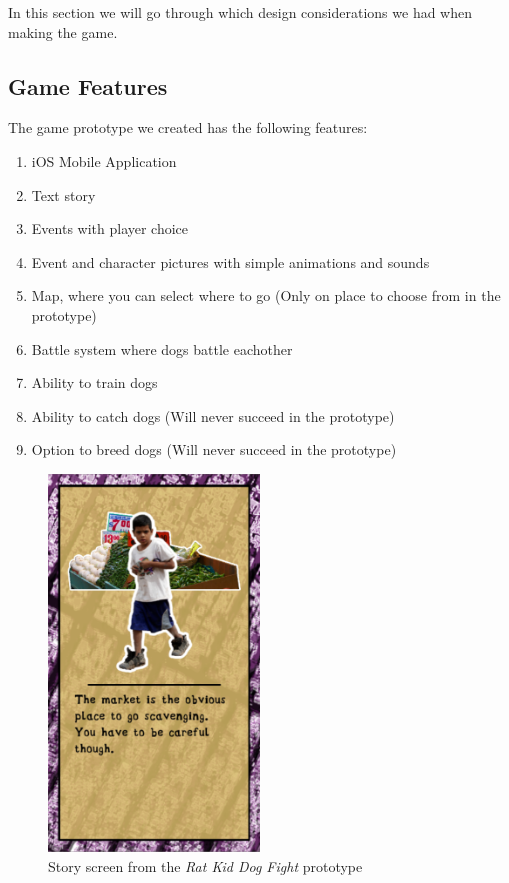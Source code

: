 In this section we will go through which design considerations we had when making the game.\

\subsection{Game Features}
The game prototype we created has the following features:

\begin{enumerate}
	\item iOS Mobile Application
	\item Text story
	\item Events with player choice
	\item Event and character pictures with simple animations and sounds
	\item Map, where you can select where to go (Only on place to choose from in the prototype)
	\item Battle system where dogs battle eachother
	\item Ability to train dogs
	\item Ability to catch dogs (Will never succeed in the prototype)
	\item Option to breed dogs (Will never succeed in the prototype)
\end{enumerate}

\begin{figure}[h!] 
	\centering
    \includegraphics[width=0.5\textwidth]{GameScreen1.png}
    \caption{Story screen from the \textit{Rat Kid Dog Fight} prototype}
    \label{fig:GameScreen}
\end{figure}

